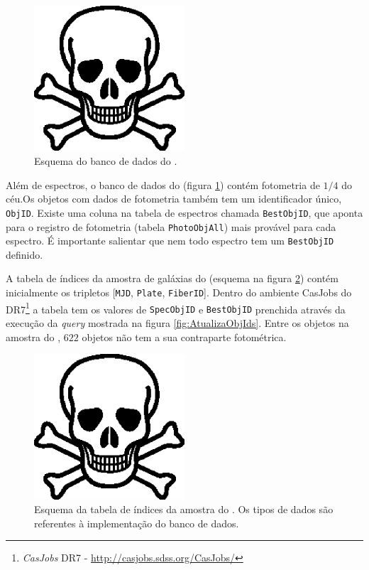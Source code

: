 \begin{figure}
	\includegraphics[width=0.5\textwidth]{figuras/test.eps}
	\caption[Esquema do banco de dados do \SDSS.]
	{Esquema do banco de dados do \SDSS.}
	\label{fig:EsquemaSDSS}
\end{figure}

Além de espectros, o banco de dados do \SDSS (figura \ref{fig:EsquemaSDSS})
contém fotometria de $1/4$ do céu.\citneed Os objetos com dados de fotometria
também tem um identificador único, {\tt ObjID}. Existe uma coluna na tabela de
espectros chamada {\tt BestObjID}, que aponta para o registro de fotometria
(tabela {\tt PhotoObjAll}) mais provável para cada espectro. É importante
salientar que nem todo espectro tem um {\tt BestObjID} definido.

A tabela de índices da amostra de galáxias do \starlight (esquema na figura
\ref{fig:TabelaAmostraStarlight}) contém inicialmente os tripletos [{\tt MJD},
{\tt Plate}, {\tt FiberID}]. Dentro do ambiente {CasJobs} do \SDSS
DR7\footnote{{\em CasJobs} \SDSS DR7 - \url{http://casjobs.sdss.org/CasJobs/}} a
tabela tem os valores de {\tt SpecObjID} e {\tt BestObjID} prenchida através da
execução da {\em query} mostrada na figura \ref{fig:AtualizaObjIds}. Entre os
objetos na amostra do \starlight, $622$ objetos não tem a sua contraparte
fotométrica.

\begin{figure}
	\includegraphics[width=0.5\textwidth]{figuras/test.eps}
	\caption[Esquema da tabela de índices da amostra do \starlight.]
	{Esquema da tabela de índices da amostra do \starlight. Os tipos de dados são
	referentes à implementação do banco de dados.}
	\label{fig:TabelaAmostraStarlight}
\end{figure}


